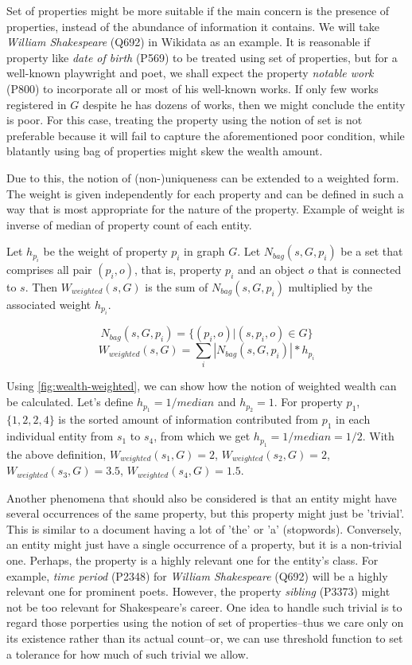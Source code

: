 Set of properties might be more suitable if the main concern is the presence of properties, instead of the abundance of information it contains. We will take \textit{William Shakespeare} (Q692) in Wikidata as an example. It is reasonable if property like  \textit{date of birth} (P569) to be treated using set of properties, but for a well-known playwright and poet, we shall expect the property \textit{notable work} (P800) to incorporate all or most of his well-known works. If only few works registered in \(G\) despite he has dozens of works, then we might conclude the entity is poor. For this case, treating the property using the notion of set is not preferable because it will fail to capture the aforementioned poor condition, while blatantly using bag of properties might skew the wealth amount.

Due to this, the notion of (non-)uniqueness can be extended to a weighted form. The weight is given independently for each property and can be defined in such a way that is most appropriate for the nature of the property. Example of weight is inverse of median of property count of each entity.

Let \(h_{p_i}\) be the weight of property \(p_i\) in graph \(G\). Let \(N_{bag}(s,G,p_i)\) be a set that comprises all pair  \((p_i,o)\), that is, property \(p_i\) and an object \(o\) that is connected to \(s\). Then \(W_{weighted}(s, G)\) is the sum of \(N_{bag}(s,G,p_i)\) multiplied by the associated weight \(h_{p_i}\).


\[
    N_{bag}(s,G,p_i) = \{(p_i, o) | (s, p_i, o) \in G\}
\]
\[
    W_{weighted}(s, G) = \sum_i |N_{bag}(s,G,p_i)| * h_{p_i}
\]

Using \autoref{fig:wealth-weighted}, we can show how the notion of weighted wealth can be calculated. Let's define \(h_{p_1} = 1/median\) and \(h_{p_2} = 1\). For property \(p_1\), \(\{1, 2, 2, 4\}\) is the sorted amount of information contributed from \(p_1\) in each individual entity from \(s_1\) to \(s_4\), from which we get \(h_{p_1} = 1/median = 1/2\). With the above definition, \(W_{weighted}(s_1, G) = 2\), \(W_{weighted}(s_2, G) = 2\), \(W_{weighted}(s_3, G) = 3.5\), \(W_{weighted}(s_4, G) = 1.5\).

Another phenomena that should also be considered is that an entity might have several occurrences of the same property, but this property might just be 'trivial'. This is similar to a document having a lot of 'the' or 'a' (stopwords). Conversely, an entity might just have a single occurrence of a property, but it is a non-trivial one. Perhaps, the property is a highly relevant one for the entity's class. For example, \textit{time period} (P2348) for \textit{William Shakespeare} (Q692) will be a highly relevant one for prominent poets. However, the property \textit{sibling} (P3373) might not be too relevant for Shakespeare's career. One idea to handle such trivial is to regard those porperties using the notion of set of properties--thus we care only on its existence rather than its actual count--or, we can use threshold function to set a tolerance for how much of such trivial we allow.

